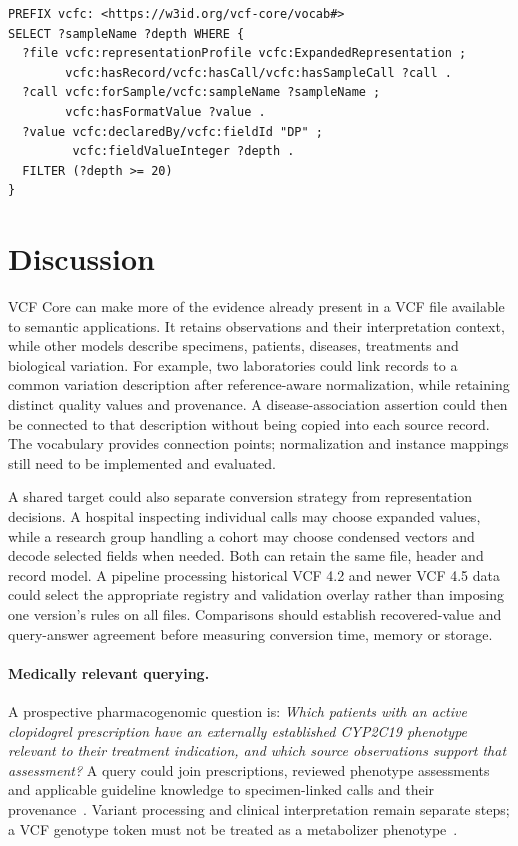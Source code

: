 \documentclass{ceurart}
\begin{document}
\begin{lstlisting}[caption={Direct access to sample depth in the expanded representation.},label={lst:depth}]
PREFIX vcfc: <https://w3id.org/vcf-core/vocab#>
SELECT ?sampleName ?depth WHERE {
  ?file vcfc:representationProfile vcfc:ExpandedRepresentation ;
        vcfc:hasRecord/vcfc:hasCall/vcfc:hasSampleCall ?call .
  ?call vcfc:forSample/vcfc:sampleName ?sampleName ;
        vcfc:hasFormatValue ?value .
  ?value vcfc:declaredBy/vcfc:fieldId "DP" ;
         vcfc:fieldValueInteger ?depth .
  FILTER (?depth >= 20)
}
\end{lstlisting}

\section{Discussion}
\label{sec:discussion}

VCF Core can make more of the evidence already present in a VCF file available to semantic applications.
It retains observations and their interpretation context, while other models describe specimens, patients, diseases, treatments and biological variation.
For example, two laboratories could link records to a common variation description after reference-aware normalization, while retaining distinct quality values and provenance.
A disease-association assertion could then be connected to that description without being copied into each source record.
The vocabulary provides connection points; normalization and instance mappings still need to be implemented and evaluated.

A shared target could also separate conversion strategy from representation decisions.
A hospital inspecting individual calls may choose expanded values, while a research group handling a cohort may choose condensed vectors and decode selected fields when needed.
Both can retain the same file, header and record model.
A pipeline processing historical VCF 4.2 and newer VCF 4.5 data could select the appropriate registry and validation overlay rather than imposing one version's rules on all files.
Comparisons should establish recovered-value and query-answer agreement before measuring conversion time, memory or storage.

\paragraph{Medically relevant querying.}
A prospective pharmacogenomic question is: \emph{Which patients with an active clopidogrel prescription have an externally established CYP2C19 phenotype relevant to their treatment indication, and which source observations support that assessment?}
A query could join prescriptions, reviewed phenotype assessments and applicable guideline knowledge to specimen-linked calls and their provenance~\cite{lee2022cpic}.
Variant processing and clinical interpretation remain separate steps; a VCF genotype token must not be treated as a metabolizer phenotype~\cite{pharmcatmethods}.
\end{document}
